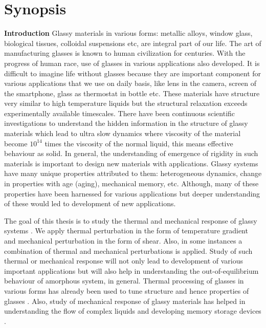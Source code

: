 \thispagestyle{plain}
\doublespacing
\chapter*{Synopsis}

\vskip 1.0cm   
{\bf {\Large Introduction}}
\vskip 0.5cm
Glassy materials in various forms: metallic alloys, window glass, biological tissues, colloidal suspensions etc, are integral part of our life. The art of manufacturing glasses is known to human civilization for centuries. With the progress of human race, use of glasses in various applications also developed. It is difficult to imagine life without glasses because they are important component for various applications that we use on daily basis, like lens in the camera, screen of the smartphone, glass as thermostat in bottle etc. These materials have structure very similar to high temperature liquids but the structural relaxation exceeds experimentally available timescales. There have been continuous scientific investigations \cite{angell1995formation, berthier2011theoretical, binder2011glassy} to understand the hidden information in the structure of glassy materials which lead to ultra slow dynamics where viscosity of the material become $10^{14}$ times the viscosity of the normal liquid, this means effective behaviour as solid. In general, the understanding of emergence of rigidity in such materials is important to design new materials with applications. Glassy systems have many unique properties attributed to them: heterogeneous dynamics, change in properties with age (aging), mechanical memory, etc. Although, many of these properties have been harnessed for various applications but deeper understanding of these would led to development of new applications.

The goal of this thesis is to study the thermal and mechanical response of glassy systems \cite{nicolas2018deformation, schuh2007mechanical}. We apply thermal perturbation in the form of temperature gradient and mechanical perturbation in the form of shear. Also, in some instances a combination of thermal and mechanical perturbations is applied. Study of such thermal or mechanical response will not only lead to development of various important applications but will also help in understanding the out-of-equilibrium behaviour of amorphous system, in general. Thermal processing of glasses in various forms has already been used to tune structure and hence properties of glasses \cite{schuh2007mechanical,hufnagel2015cryogenic,ketov2015rejuvenation}. Also, study of mechanical response of glassy materials has helped in understanding the flow of complex liquids \cite{nicolas2018deformation,bonn2017yield} and developing memory storage devices \cite{keim2019memory}.

